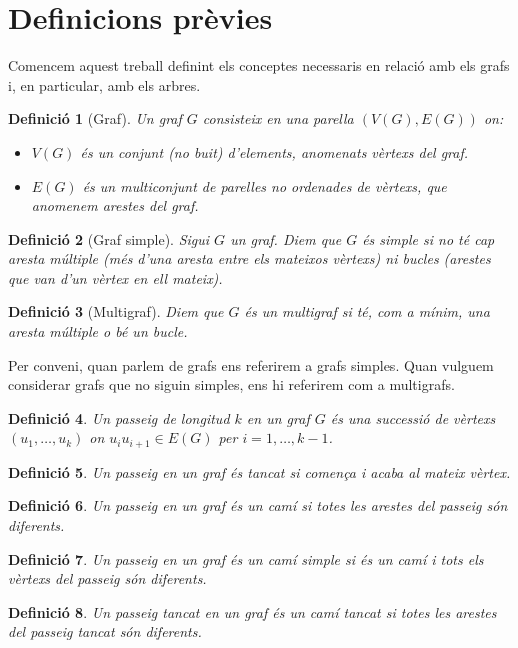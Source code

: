 \documentclass{article}
\newtheorem{definition}{Definició}[section]
\begin{document}
\section{Definicions prèvies}
Comencem aquest treball definint els conceptes necessaris en relació amb els grafs i, en particular, amb els arbres.
\begin{definition}[Graf]
    Un graf $G$ consisteix en una parella $(V(G), E(G))$ on:
    \begin{itemize}
        \item $V(G)$ és un conjunt (no buit) d'elements, anomenats vèrtexs del graf.
        \item $E(G)$ és un multiconjunt de parelles no ordenades de vèrtexs, que anomenem arestes del graf.
    \end{itemize}
\end{definition}
\begin{definition}[Graf simple]
    Sigui $G$ un graf. Diem que $G$ és simple si no té cap aresta múltiple (més d'una aresta entre els mateixos vèrtexs) ni bucles (arestes que van d'un vèrtex en ell mateix).
\end{definition}
\begin{definition}[Multigraf]
    Diem que $G$ és un multigraf si té, com a mínim, una aresta múltiple o bé un bucle.
\end{definition}
Per conveni, quan parlem de grafs ens referirem a grafs simples. Quan vulguem considerar grafs que no siguin simples, ens hi referirem com a multigrafs.
\begin{definition}
    Un \textit{passeig de longitud} $k$ en un graf $G$ és una successió de vèrtexs $(u_1,\ldots,u_k)$ on $u_iu_{i+1}\in E(G)$ per $i=1,\ldots,k-1$.
\end{definition}
\begin{definition}
    Un passeig en un graf és \textit{tancat} si comença i acaba al mateix vèrtex.
\end{definition}
\begin{definition}
    Un passeig en un graf és un \textit{camí} si totes les arestes del passeig són diferents.
\end{definition}
\begin{definition}
    Un passeig en un graf és un \textit{camí simple} si és un camí i tots els vèrtexs del passeig són diferents.
\end{definition}
\begin{definition}
    Un passeig tancat en un graf és un \textit{camí tancat} si totes les arestes del passeig tancat són diferents.
\end{definition}
\end{document}
